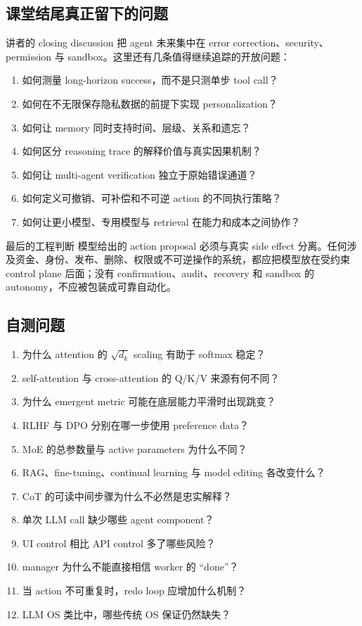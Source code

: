 \documentclass[a4paper]{article}
\begin{document}
\subsection{课堂结尾真正留下的问题}

讲者的 closing discussion 把 agent 未来集中在 error correction、security、permission 与 sandbox。这里还有几条值得继续追踪的开放问题：

\begin{enumerate}
  \item 如何测量 long-horizon success，而不是只测单步 tool call？
  \item 如何在不无限保存隐私数据的前提下实现 personalization？
  \item 如何让 memory 同时支持时间、层级、关系和遗忘？
  \item 如何区分 reasoning trace 的解释价值与真实因果机制？
  \item 如何让 multi-agent verification 独立于原始错误通道？
  \item 如何定义可撤销、可补偿和不可逆 action 的不同执行策略？
  \item 如何让更小模型、专用模型与 retrieval 在能力和成本之间协作？
\end{enumerate}

\begin{warningbox}{最后的工程判断}
模型给出的 action proposal 必须与真实 side effect 分离。任何涉及资金、身份、发布、删除、权限或不可逆操作的系统，都应把模型放在受约束 control plane 后面；没有 confirmation、audit、recovery 和 sandbox 的 autonomy，不应被包装成可靠自动化。
\end{warningbox}

\subsection{自测问题}

\begin{enumerate}
  \item 为什么 attention 的 $\sqrt{d_k}$ scaling 有助于 softmax 稳定？
  \item self-attention 与 cross-attention 的 Q/K/V 来源有何不同？
  \item 为什么 emergent metric 可能在底层能力平滑时出现跳变？
  \item RLHF 与 DPO 分别在哪一步使用 preference data？
  \item MoE 的总参数量与 active parameters 为什么不同？
  \item RAG、fine-tuning、continual learning 与 model editing 各改变什么？
  \item CoT 的可读中间步骤为什么不必然是忠实解释？
  \item 单次 LLM call 缺少哪些 agent component？
  \item UI control 相比 API control 多了哪些风险？
  \item manager 为什么不能直接相信 worker 的 ``done''？
  \item 当 action 不可重复时，redo loop 应增加什么机制？
  \item LLM OS 类比中，哪些传统 OS 保证仍然缺失？
\end{enumerate}
\end{document}
